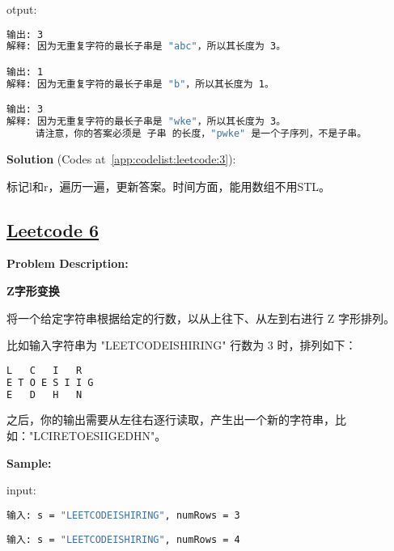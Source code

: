 otput:\par

\begin{lstlisting}[language=bash]
输出: 3 
解释: 因为无重复字符的最长子串是 "abc"，所以其长度为 3。

输出: 1
解释: 因为无重复字符的最长子串是 "b"，所以其长度为 1。

输出: 3
解释: 因为无重复字符的最长子串是 "wke"，所以其长度为 3。
     请注意，你的答案必须是 子串 的长度，"pwke" 是一个子序列，不是子串。
\end{lstlisting}

\textbf{Solution }(Codes at~\ref{app:codelist:leetcode:3}):\par

标记l和r，遍历一遍，更新答案。时间方面，能用数组不用STL。\par



\subsection{\href{https://leetcode-cn.com/}{Leetcode 6}}\label{app:problemlist:leetcode:6}

\textbf{Problem Description:}\par

\textbf{Z字形变换}\par

将一个给定字符串根据给定的行数，以从上往下、从左到右进行 Z 字形排列。\par

比如输入字符串为 "LEETCODEISHIRING" 行数为 3 时，排列如下：\par

\begin{lstlisting}[language=bash]
L   C   I   R
E T O E S I I G
E   D   H   N
\end{lstlisting}

之后，你的输出需要从左往右逐行读取，产生出一个新的字符串，比如："LCIRETOESIIGEDHN"。\par


\textbf{Sample:}\par

input:\par

\begin{lstlisting}[language=bash]
输入: s = "LEETCODEISHIRING", numRows = 3
  
输入: s = "LEETCODEISHIRING", numRows = 4
\end{lstlisting}

